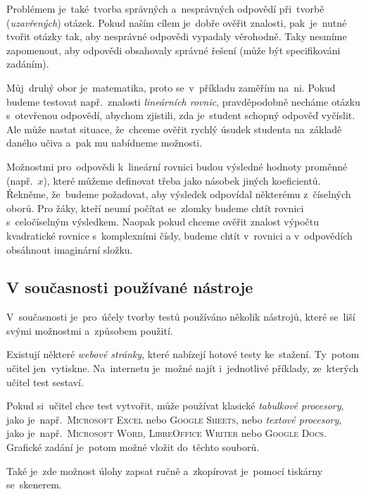 \documentclass[14pt,a4paper]{article}
\begin{document}
        Problémem je~také~tvorba správných a~nesprávných odpovědí při~tvorbě (\emph{uzavřených}) otázek. Pokud naším cílem je~dobře ověřit znalosti, pak~je~nutné tvořit otázky tak, aby nesprávné odpovědi vypadaly věrohodně. Taky nesmíme zapomenout, aby odpovědi obsahovaly správné řešení (může být specifikováni zadáním).

        Můj~druhý obor je~matematika, proto se~v~příkladu zaměřím na~ni. Pokud budeme testovat např.~znalosti \emph{lineárních rovnic}, pravděpodobně necháme otázku s~otevřenou odpovědí, abychom zjistili, zda je~student schopný odpověď vyčíslit. Ale může nastat situace, že~chceme ověřit rychlý úsudek studenta na~základě daného učiva a~pak mu nabídneme možnosti.

        Možnostmi pro~odpovědi k~lineární rovnici budou výsledné hodnoty proměnné (např.~$x$), které můžeme definovat třeba jako násobek jiných koeficientů. Řekněme, že~budeme požadovat, aby výsledek odpovídal některému z~číselných oborů. Pro žáky, kteří neumí počítat se~zlomky budeme chtít rovnici s~celočíselným výsledkem. Naopak pokud chceme ověřit znalost výpočtu kvadratické rovnice s~komplexními čísly, budeme chtít v~rovnici a v~odpovědích obsáhnout imaginární složku.

        \subsection{V současnosti používané nástroje}
        V~současnosti je~pro~účely tvorby testů používáno několik nástrojů, které se~liší svými možnostmi a~způsobem použití.
        
        Existují některé \emph{webové stránky}, které nabízejí hotové testy ke~stažení. 
        Ty~potom učitel jen~vytiskne. Na~internetu je~možné najít i~jednotlivé příklady, ze~kterých učitel test sestaví.

        Pokud si~učitel chce test vytvořit, může používat klasické \emph{tabulkové procesory}, jako je~např.~\textsc{Microsoft Excel} nebo \textsc{Google Sheets}, nebo \emph{textové procesory}, jako je~např.~\textsc{Microsoft Word}, \textsc{LibreOffice Writer} nebo \textsc{Google Docs}. Grafické zadání je~potom možné vložit do~těchto souborů.

        
        Také je~zde možnost úlohy zapsat ručně a~zkopírovat je~pomocí tiskárny se~skenerem.
\end{document}
